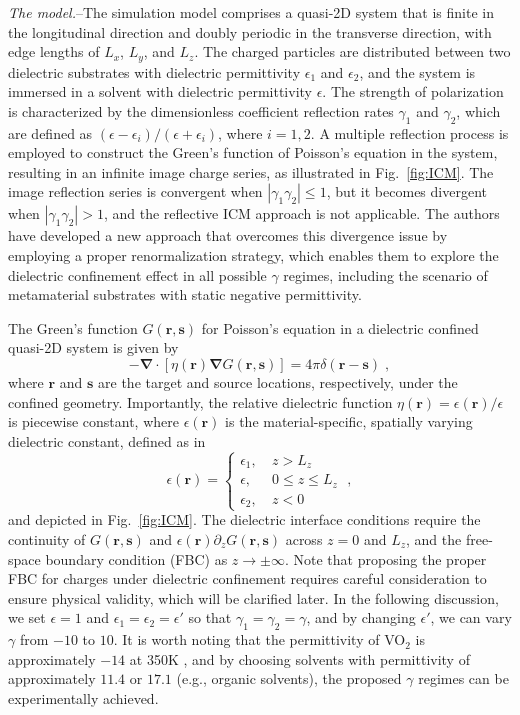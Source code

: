 \documentclass[aps,prl,reprint,showpacs,floatfix,superscriptaddress]{revtex4-2}
\newcommand{\V}[1]{\boldsymbol{#1}} %
\newcommand{\M}[1]{\boldsymbol{#1}} %
\renewcommand{\d}[1]{\delta#1} %
\newcommand{\grad}{\M{\nabla}} %
\newcommand{\eps}{\epsilon}
\begin{document}
\textit{The model.}--The simulation model comprises a quasi-2D system that is finite in the longitudinal direction and doubly periodic in the transverse direction, with edge lengths of $L_x$, $L_y$, and $L_z$. 
The charged particles are distributed between two dielectric substrates with dielectric permittivity $\epsilon_1$ and $\epsilon_2$, and the system is immersed in a solvent with dielectric permittivity $\epsilon$. 
The strength of polarization is characterized by the dimensionless coefficient reflection rates $\gamma_1$ and $\gamma_2$, which are defined as $(\epsilon-\epsilon_i)/(\epsilon+\epsilon_i)$, where $i=1,2$. 
A multiple reflection process is employed to construct the Green's function of Poisson's equation in the system, resulting in an infinite image charge series, as illustrated in Fig.~\ref{fig:ICM}. 
The image reflection series is convergent when $|\gamma_1\gamma_2|\leq 1$, but it becomes divergent when $|\gamma_1\gamma_2|>1$, and the reflective ICM approach is not applicable. 
The authors have developed a new approach that overcomes this divergence issue by employing a proper renormalization strategy, which enables them to explore the dielectric confinement effect in all possible $\gamma$ regimes, including the scenario of metamaterial substrates with static negative permittivity.


The Green's function $G(\V{r},\V{s})$ for Poisson's equation in a dielectric confined quasi-2D system is given by
\begin{equation}
    -\grad\cdot\left[\eta(\V r) \grad G(\V{r},\V{s})\right] = 4 \pi \d(\V r - \V s )\;,\label{eq:Green4Poisson}
\end{equation}
where $\V{r}$ and $\V{s}$ are the target and source locations, respectively, under the confined geometry. 
Importantly, the relative dielectric function $\eta(\V r) = \eps(\V{r})/\eps$ is piecewise constant, where $\eps(\V{r})$ is the material-specific, spatially varying dielectric constant, defined as in
\begin{equation}
    \eps(\V{r}) = \left\{
    \begin{array}{cc}
        \eps_1,~ & z > L_z \\
        \eps,~ & 0 \leq z \leq L_z \\
        \eps_2,~ & z < 0
    \end{array}
    \right. \;,
\end{equation}
and depicted in Fig.~\ref{fig:ICM}. 
The dielectric interface conditions require the continuity of $G(\V r, \V s)$ and $\epsilon(\V r)\partial_z G(\V r, \V s)$ across $z=0$ and $L_z$, and the free-space boundary condition (FBC) as $z\to\pm\infty$. 
Note that proposing the proper FBC for charges under dielectric confinement requires careful consideration to ensure physical validity, which will be clarified later. 
In the following discussion, we set $\eps=1$ and $\eps_1=\eps_2=\eps'$ so that $\gamma_1=\gamma_2=\gamma$, and by changing $\eps'$, we can vary $\gamma$ from $-10$ to $10$. It is worth noting that the permittivity of VO$_2$ is approximately $-14$ at 350K \cite{kana2016thermally}, and by choosing solvents with permittivity of approximately $11.4$ or $17.1$ (e.g., organic solvents), the proposed $\gamma$ regimes can be experimentally achieved.
\end{document}
